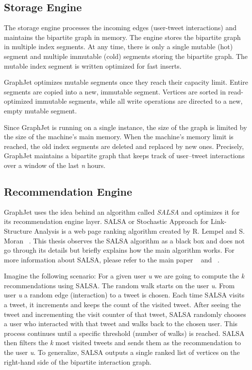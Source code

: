 \subsection{Storage Engine}
\label{subsec:GraphJet-Storage-Engine}
The storage engine processes the incoming edges (user-tweet interactions) and maintains the bipartite graph in memory. The engine stores the bipartite graph in multiple index segments. At any time, there is only a single mutable (hot) segment and multiple immutable (cold) segments storing the bipartite graph. The mutable index segment is written optimized for fast inserts. 

GraphJet optimizes mutable segments once they reach their capacity limit. Entire segments are copied into a new, immutable segment. Vertices are sorted in read-optimized immutable segments, while all write operations are directed to a new, empty mutable segment.

Since GraphJet is running on a single instance, the size of the graph is limited by the size of the machine's main memory. When the machine's memory limit is reached, the old index segments are deleted and replaced by new ones. Precisely, GraphJet maintains a bipartite graph that keeps track of user–tweet interactions over a window of the last \textit{n} hours.

\subsection{Recommendation Engine}
\label{subsec:GraphJet-Recommendation-Engine}
GraphJet uses the idea behind an algorithm called \emph{SALSA} and optimizes it for its recommendation engine layer. SALSA or Stochastic Approach for Link-Structure Analysis is a web page ranking algorithm created by R. Lempel and S. Moran ~\cite{lempelSALSAStochasticApproach2001}. This thesis observes the SALSA algorithm as a black box and does not go through its details but briefly explains how the main algorithm works. For more information about SALSA, please refer to the main paper ~\cite{lempelSALSAStochasticApproach2001} and ~\cite{sharmaGraphJetRealtimeContent2016}.

Imagine the following scenario: For a given user \textit{u} we are going to compute the \textit{k} recommendations using SALSA. The random walk starts on the user \textit{u}. From user \textit{u} a random edge (interaction) to a tweet is chosen. Each time SALSA visits a tweet, it increments and keeps the count of the visited tweet. After seeing the tweet and incrementing the visit counter of that tweet, SALSA randomly chooses a user who interacted with that tweet and walks back to the chosen user. This process continues until a specific threshold (number of walks) is reached. SALSA then filters the \textit{k} most visited tweets and sends them as the recommendation to the user \textit{u}. To generalize, SALSA outputs a  single ranked list of vertices on the right-hand side of the bipartite interaction graph.


